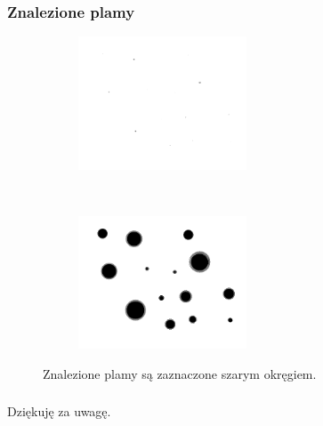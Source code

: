 \begin{frame}
\frametitle{Znalezione plamy}
\begin{figure}
\begin{center}
\begin{subfigure}[b]{5cm}
\centering
\includegraphics[width=5cm]{outp.png}
\end{subfigure}~
\begin{subfigure}[b]{5cm}
\centering
\includegraphics[width=5cm]{result.png}
\end{subfigure}
\end{center}
\caption{Znalezione plamy są zaznaczone szarym okręgiem.}
\end{figure}
\end{frame}

\begin{frame}
\frametitle{}
\begin{center}
Dziękuję za uwagę.
\end{center}
\end{frame}